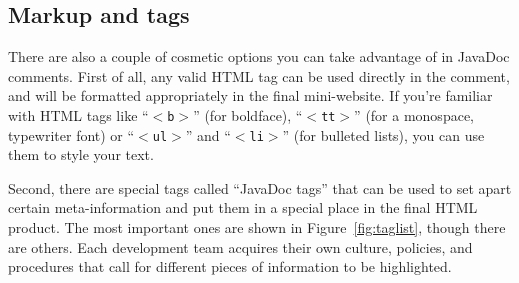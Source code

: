 \subsection{Markup and tags}

There are also a couple of cosmetic options you can take advantage of in
JavaDoc comments. First of all, any valid HTML tag can be used directly in the
comment, and will be formatted appropriately in the final mini-website. If
you're familiar with HTML tags like ``\texttt{$<$b$>$}'' (for boldface),
``\texttt{$<$tt$>$}'' (for a monospace, typewriter font) or
``\texttt{$<$ul$>$}'' and ``\texttt{$<$li$>$}'' (for bulleted lists), you can
use them to style your text.

Second, there are special tags called ``JavaDoc tags'' that can be used to set
apart certain meta-information and put them in a special place in the final
HTML product. The most important ones are shown in Figure~\ref{fig:taglist},
though there are others. Each development team acquires their own culture,
policies, and procedures that call for different pieces of information to be
highlighted.

